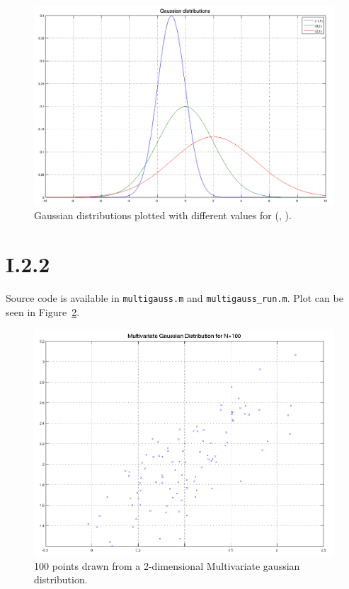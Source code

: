 \begin{figure}[h!]
	\includegraphics[width=\textwidth]{img/unigauss}
	\caption{Gaussian distributions plotted with different values for
          (\mu, \sigma). \label{fig:I.2.1}}
\end{figure}

\section*{I.2.2}
Source code is available in \texttt{multigauss.m} and \texttt{multigauss\_run.m}.
Plot can be seen in Figure~\ref{fig:I.2.2}.
\begin{figure}[h!]
	\includegraphics[width=\textwidth]{img/multigauss}
	\caption{100 points drawn from a 2-dimensional Multivariate gaussian
          distribution. \label{fig:I.2.2}}
\end{figure}

